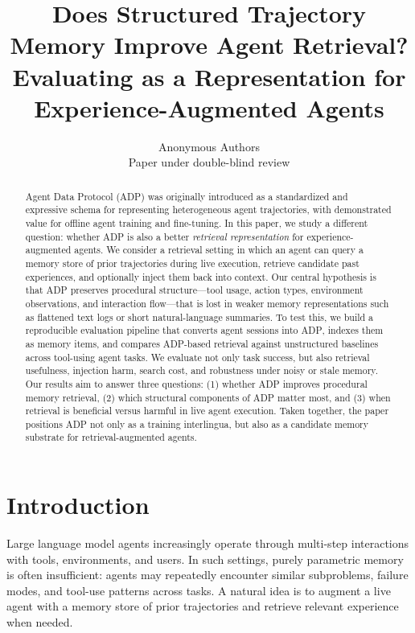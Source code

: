 \documentclass{article}
\title{Does Structured Trajectory Memory Improve Agent Retrieval?\\
Evaluating \ADP{} as a Representation for Experience-Augmented Agents}
\author{Anonymous Authors\\
Paper under double-blind review}
\newcommand{\ADP}{\textsc{ADP}}
\begin{document}
\maketitle

\begin{abstract}
Agent Data Protocol (\ADP{}) was originally introduced as a standardized and expressive schema for
representing heterogeneous agent trajectories, with demonstrated value for offline agent training and
fine-tuning. In this paper, we study a different question: whether \ADP{} is also a better
\emph{retrieval representation} for experience-augmented agents.
We consider a retrieval setting in which an agent can query a memory store of prior trajectories during
live execution, retrieve candidate past experiences, and optionally inject them back into context.
Our central hypothesis is that \ADP{} preserves procedural structure---tool usage, action types,
environment observations, and interaction flow---that is lost in weaker memory representations such as
flattened text logs or short natural-language summaries.
To test this, we build a reproducible evaluation pipeline that converts agent sessions into \ADP{},
indexes them as memory items, and compares \ADP{}-based retrieval against unstructured baselines across
tool-using agent tasks.
We evaluate not only task success, but also retrieval usefulness, injection harm, search cost, and
robustness under noisy or stale memory.
Our results aim to answer three questions:
(1) whether \ADP{} improves procedural memory retrieval,
(2) which structural components of \ADP{} matter most, and
(3) when retrieval is beneficial versus harmful in live agent execution.
Taken together, the paper positions \ADP{} not only as a training interlingua, but also as a candidate
memory substrate for retrieval-augmented agents.
\end{abstract}

\section{Introduction}
Large language model agents increasingly operate through multi-step interactions with tools,
environments, and users.
In such settings, purely parametric memory is often insufficient:
agents may repeatedly encounter similar subproblems, failure modes, and tool-use patterns across tasks.
A natural idea is to augment a live agent with a memory store of prior trajectories and retrieve relevant
experience when needed.
\end{document}
